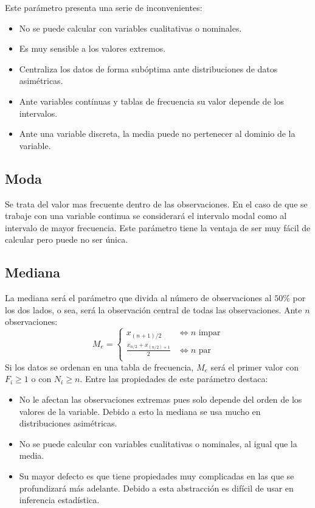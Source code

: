 \documentclass[10pt,a4paper]{book}
\begin{document}
Este parámetro presenta una serie de inconvenientes:
\begin{itemize}
	\item No se puede calcular con variables cualitativas o nominales.
	\item Es muy sensible a los valores extremos.
	\item Centraliza los datos de forma subóptima ante distribuciones de datos asimétricas.
	\item Ante variables contínuas y tablas de frecuencia su valor depende de los intervalos.
	\item Ante una variable discreta, la media puede no pertenecer al dominio de la variable.
\end{itemize}

\subsection{Moda}
Se trata del valor mas frecuente dentro de las observaciones. En el caso de que se trabaje con una variable continua se considerará el intervalo modal como al intervalo de mayor frecuencia. Este parámetro tiene la ventaja de ser muy fácil de calcular pero puede no ser única.
\subsection{Mediana}
La mediana será el parámetro que divida al número de observaciones al $50\%$ por los dos lados, o sea, será la observación central de todas las observaciones. Ante $n$ observaciones: 
\[M_e = \begin{cases}
		x_{(n+1)/2} & \iff n\text{ impar}\\
		\frac{x_{n/2} + x_{(n/2)+1}}{2} & \iff n\text{ par}\\
	\end{cases}\]
Si los datos se ordenan en una tabla de frecuencia, $M_e$ será el primer valor con $F_i\geq 1$ o con $N_i\geq n$. Entre las propiedades de este parámetro destaca: 
\begin{itemize}
	\item No le afectan las observaciones extremas pues solo depende del orden de los valores de la variable. Debido a esto la mediana se usa mucho en distribuciones asimétricas.
	\item No se puede calcular con variables cualitativas o nominales, al igual que la media.
	\item Su mayor defecto es que tiene propiedades muy complicadas en las que se profundizará más adelante. Debido a esta abstracción es difícil de usar en inferencia estadística.
\end{itemize}
\end{document}

